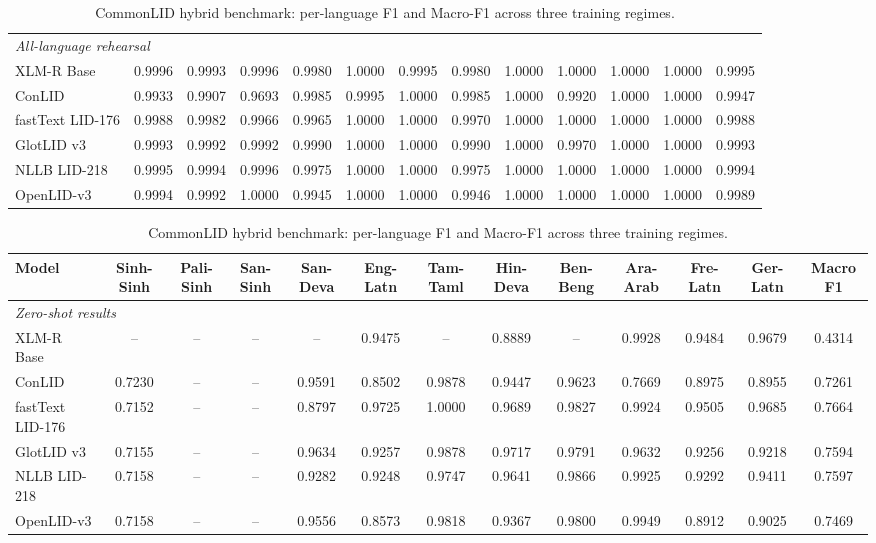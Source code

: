 \documentclass[11pt]{article}
\begin{document}
\begin{table}[p]
\begin{tabular}{l ccc cccccccc c}
\midrule
\multicolumn{13}{l}{\textit{All-language rehearsal}} \\
XLM-R Base & 0.9996 & 0.9993 & 0.9996 & 0.9980 & 1.0000 & 0.9995 & 0.9980 & 1.0000 & 1.0000 & 1.0000 & 1.0000 & 0.9995 \\
ConLID & 0.9933 & 0.9907 & 0.9693 & 0.9985 & 0.9995 & 1.0000 & 0.9985 & 1.0000 & 0.9920 & 1.0000 & 1.0000 & 0.9947 \\
fastText LID-176 & 0.9988 & 0.9982 & 0.9966 & 0.9965 & 1.0000 & 1.0000 & 0.9970 & 1.0000 & 1.0000 & 1.0000 & 1.0000 & 0.9988 \\
GlotLID v3 & 0.9993 & 0.9992 & 0.9992 & 0.9990 & 1.0000 & 1.0000 & 0.9990 & 1.0000 & 0.9970 & 1.0000 & 1.0000 & 0.9993 \\
NLLB LID-218 & 0.9995 & 0.9994 & 0.9996 & 0.9975 & 1.0000 & 1.0000 & 0.9975 & 1.0000 & 1.0000 & 1.0000 & 1.0000 & 0.9994 \\
OpenLID-v3 & 0.9994 & 0.9992 & 1.0000 & 0.9945 & 1.0000 & 1.0000 & 0.9946 & 1.0000 & 1.0000 & 1.0000 & 1.0000 & 0.9989 \\
\bottomrule
\end{tabular}
\vspace{4pt}
\caption{CommonLID hybrid benchmark: per-language F1 and Macro-F1 across three training regimes.}
\label{tab:common_full}
\begin{tabular}{l ccc cccccccc c}
\toprule
\textbf{Model} & \textbf{Sinh-Sinh} & \textbf{Pali-Sinh} & \textbf{San-Sinh} & \textbf{San-Deva} & \textbf{Eng-Latn} & \textbf{Tam-Taml} & \textbf{Hin-Deva} & \textbf{Ben-Beng} & \textbf{Ara-Arab} & \textbf{Fre-Latn} & \textbf{Ger-Latn} & \textbf{Macro F1} \\
\midrule
\multicolumn{13}{l}{\textit{Zero-shot results}} \\
XLM-R Base & -- & -- & -- & -- & 0.9475 & -- & 0.8889 & -- & 0.9928 & 0.9484 & 0.9679 & 0.4314 \\
ConLID & 0.7230 & -- & -- & 0.9591 & 0.8502 & 0.9878 & 0.9447 & 0.9623 & 0.7669 & 0.8975 & 0.8955 & 0.7261 \\
fastText LID-176 & 0.7152 & -- & -- & 0.8797 & 0.9725 & 1.0000 & 0.9689 & 0.9827 & 0.9924 & 0.9505 & 0.9685 & 0.7664 \\
GlotLID v3 & 0.7155 & -- & -- & 0.9634 & 0.9257 & 0.9878 & 0.9717 & 0.9791 & 0.9632 & 0.9256 & 0.9218 & 0.7594 \\
NLLB LID-218 & 0.7158 & -- & -- & 0.9282 & 0.9248 & 0.9747 & 0.9641 & 0.9866 & 0.9925 & 0.9292 & 0.9411 & 0.7597 \\
OpenLID-v3 & 0.7158 & -- & -- & 0.9556 & 0.8573 & 0.9818 & 0.9367 & 0.9800 & 0.9949 & 0.8912 & 0.9025 & 0.7469 \\

\end{tabular}
\end{table}
\end{document}
